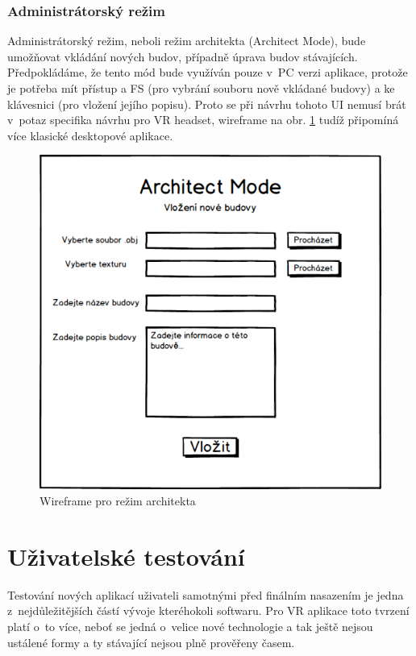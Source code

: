 \documentclass[thesis=B,czech]{FITthesis}[2012/06/26]
\begin{document}
	\subsubsection{Administrátorský režim}
Administrátorský režim, neboli režim architekta (Architect Mode), bude umožňovat vkládání nových budov, případně úprava budov stávajících. Předpokládáme, že tento mód bude využíván pouze v~PC verzi aplikace, protože je potřeba mít přístup a FS (pro vybrání souboru nově vkládané budovy) a ke klávesnici (pro vložení jejího popisu). Proto se při návrhu tohoto UI nemusí brát v~potaz specifika návrhu pro VR headset, wireframe na obr. \ref{fig:ArchitectMock} tudíž připomíná více klasické desktopové aplikace.

\begin{figure}
  		\includegraphics[width=\textwidth,height=\textheight,keepaspectratio]{ArchitectMock.png}
  		\caption{Wireframe pro režim architekta}
  		\label{fig:ArchitectMock}
	\end{figure}
	
	\section{Uživatelské testování}
	
	Testování nových aplikací uživateli samotnými před finálním nasazením je jedna z~nejdůležitějších částí vývoje kteréhokoli softwaru. Pro VR aplikace toto tvrzení platí o~to více, neboť se jedná o~velice nové technologie a tak ještě nejsou ustálené formy a ty stávající nejsou plně prověřeny časem.
	
\end{document}
